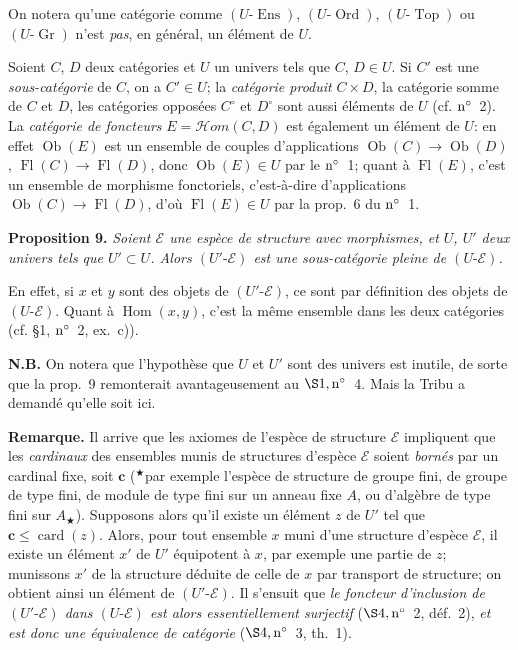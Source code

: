 \documentclass[12pt]{article}
\newcommand{\nn}{\noindent}
\newcommand{\card}{\operatorname{card}}
\newcommand{\Top}{\operatorname{Top}}
\newcommand{\Hom}{\operatorname{Hom}}
\newcommand{\Ob}{\operatorname{Ob}}
\newcommand{\Ens}{\operatorname{Ens}}
\newcommand{\Ord}{\operatorname{Ord}}
\newcommand{\Gr}{\operatorname{Gr}}
\newcommand{\Fl}{\operatorname{Fl}}
\newcommand{\Hhom}{\mathcal H om}
\begin{document}
On notera qu'une catégorie comme $(U\text{-}\Ens)$, $(U\text{-}\Ord)$, $(U\text{-}\Top)$ ou $(U\text{-}\Gr)$ n'est \emph{pas}, en général, un élément de $U$.

Soient $C$, $D$ deux catégories et $U$ un univers tels que $C$, $D\in U$. Si $C'$ est une \emph{sous-catégorie} de $C$, on a $C'\in U$; la \emph{catégorie produit} $C\times D$, la catégorie somme de $C$ et $D$, les catégories opposées $C^{\circ}$ et $D^{\circ}$ sont aussi éléments de $U$ (cf. $\rm n^\circ$~2). La \emph{catégorie de foncteurs} $E=\Hhom(C,D)$ est également un élément de $U$: en effet $\Ob(E)$ est un ensemble de couples d'applications $\Ob(C)\rightarrow\Ob(D)$, $\Fl(C)\rightarrow\Fl(D)$, donc $\Ob(E)\in U$ par le $\rm n^\circ$~1; quant à $\Fl(E)$, c'est un ensemble de morphisme fonctoriels, c'est-à-dire d'applications $\Ob(C)\rightarrow\Fl(D)$, d'où $\Fl(E)\in U$ par la prop.~6 du $\rm n^\circ$~1.

\nn\textbf{Proposition 9.} \emph{Soient $\mathcal{E}$ une espèce de structure avec morphismes, et $U$, $U'$ deux univers tels que $U'\subset U$. Alors $(U'\text{-}\mathcal{E})$ est une sous-catégorie pleine de $(U\text{-}\mathcal{E})$.}

En effet, si $x$ et $y$ sont des objets de $(U'\text{-}\mathcal{E})$, ce sont par définition des objets de $(U\text{-}\mathcal{E})$. Quant à $\Hom(x,y)$, c'est la même ensemble dans les deux catégories (cf. \S1, $\rm n^\circ$~2, ex.~c)).

\nn\textbf{N.B.} On notera que l'hypothèse que $U$ et $U'$ sont des univers  est inutile, de sorte que la prop.~9 remonterait avantageusement au $\S1, \rm n^\circ$~4. Mais la Tribu a demandé qu'elle soit ici.

\nn\textbf{Remarque.} Il arrive que les axiomes de l'espèce de structure $\mathcal{E}$ impliquent que les \emph{cardinaux} des ensembles munis de structures d'espèce $\mathcal{E}$ soient \emph{bornés} par un cardinal fixe, soit $\mathbf c$ (${}^\bigstar$par exemple l'espèce de structure de groupe fini, de groupe de type fini, de module de type fini sur un anneau fixe $A$, ou d'algèbre de type fini sur $A_\bigstar$). Supposons alors qu'il existe un élément $z$ de $U'$ tel que $\mathbf c\leq\card(z)$. Alors, pour tout ensemble $x$ muni d'une structure d'espèce $\mathcal{E}$, il existe un élément $x'$ de $U'$ équipotent à $x$, par exemple une partie de $z$; munissons $x'$ de la structure déduite de celle de $x$ par transport de structure; on obtient ainsi un élément de $(U'\text{-}\mathcal{E})$. Il s'ensuit que \emph{le foncteur d'inclusion de $(U'\text{-}\mathcal{E})$ dans $(U\text{-}\mathcal{E})$ est alors essentiellement surjectif} ($\S 4, \rm n^\circ$~2, déf.~2), \emph{et est donc une équivalence de catégorie} ($\S 4, \rm n^\circ$~3, th.~1).
\end{document}
